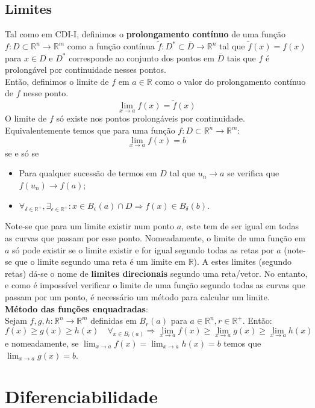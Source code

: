 \documentclass{article}
\begin{document}
\subsection{Limites}
Tal como em CDI-I, definimos o \textbf{prolongamento contínuo} de uma função $f: D \subset \mathbb{R}^n \to \mathbb{R}^m$ como a função contínua $\tilde{f}: D^* \subset \overline{D} \to \mathbb{R}^n$ tal que $\tilde{f}(x) = f(x)$ para $x \in D$ e $D^*$ corresponde ao conjunto dos pontos em $\overline{D}$ tais que $f$ é prolongável por continuidade nesses pontos.\\
Então, definimos o limite de $f$ em $a \in \mathbb{R}$ como o valor do prolongamento contínuo de $f$ nesse ponto.
$$
\lim_{x \to a} f(x) = \tilde{f}(x)
$$
O limite de $f$ só existe nos pontos prolongáveis por continuidade.\\
Equivalentemente temos que para uma função $f: D \subset \mathbb{R}^n \to \mathbb{R}^m$:
$$
\lim_{x \to a} f(x) = b
$$
se e só se
\begin{itemize}
	\item Para qualquer sucessão de termos em $D$ tal que $u_n \to a$ se verifica que $f(u_n) \to f(a)$;
	\item $\forall_{\delta \in \mathbb{R}^+}, \exists_{\epsilon \in \mathbb{R}^+}: x \in B_\epsilon(a) \cap D \Rightarrow f(x) \in B_\delta(b)$.
\end{itemize}
Note-se que para um limite existir num ponto $a$, este tem de ser igual em todas as curvas que passam por esse ponto. Nomeadamente, o limite de uma função em $a$ só pode existir se o limite existir e for igual segundo todas as retas por $a$ (note-se que o limite segundo uma reta é um limite em $\mathbb{R}$). A estes limites (segundo retas) dá-se o nome de \textbf{limites direcionais} segundo uma reta/vetor.
No entanto, e como é impossível verificar o limite de uma função segundo todas as curvas que passam por um ponto, é necessário um método para calcular um limite.\\
\textbf{Método das funções enquadradas}:\\
Sejam $f,g,h: \mathbb{R}^n \to \mathbb{R}^m$ definidas em $B_r(a)$ para $a \in \mathbb{R}^n, r \in \mathbb{R}^+$. Então:
$$
f(x) \geq g(x) \geq h(x) \quad \forall_{x \in B_r(a)} \Rightarrow \lim_{x \to a} f(x) \geq \lim_{x \to a} g(x) \geq \lim_{x \to a} h(x) 
$$
e nomeadamente, se $\lim_{x \to a} f(x) = \lim_{x \to a} h(x) = b$ temos que $\lim_{x \to a} g(x) = b$.

\section{Diferenciabilidade}
\end{document}
